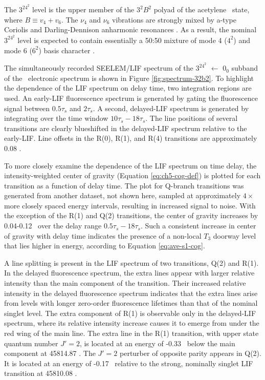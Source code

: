 The $3^24^2$ level is the upper member of the $3^2B^2$ polyad of the
acetylene \astate\ state, where $B \equiv v_4 + v_6$.  The $\nu_4$ and
$\nu_6$ vibrations are strongly mixed by a-type Coriolis and
Darling-Dennison anharmonic resonances \cite{merer08}.  As a result,
the nominal $3^24^2$ level is expected to contain essentially a 50:50
mixture of mode 4 ($4^2$) and mode 6 ($6^2$) basis character
\cite{merer08, virgo07}.

The simultaneously recorded SEELEM/LIF spectrum of the $3^24^2$ 
$\leftarrow$ $0_0$ subband of the \AtoX\ electronic spectrum is shown
in Figure \ref{fig:spectrum-32b2}. To highlight the dependence of the
LIF spectrum on delay time, two integration regions are used.  An
early-LIF fluorescence spectrum is generated by gating the
fluorescence signal between $0.5\tau_s$ and $2\tau_s$.  A second,
delayed-LIF spectrum is generated by integrating over the time window
$10\tau_s-18\tau_s$.  The line positions of several transitions are
clearly blueshifted in the delayed-LIF spectrum relative to the
early-LIF.  Line offsets in the R(0), R(1), and R(4) transitions are
approximately 0.08 \rcm.

To more closely examine the dependence of the LIF spectrum on time
delay, the intensity-weighted center of gravity (Equation
\ref{eq:ch5-cog-def}) is plotted for each transition as a function of
delay time.  The plot for Q-branch transitions was generated from
another dataset, not shown here, sampled at approximately $4 \times$
more closely spaced energy intervals, resulting in increased signal to
noise.  With the exception of the R(1) and Q(2) transitions, the
center of gravity increases by 0.04-0.12 \rcm\ over the delay range
$0.5\tau_s-18\tau_s$.  Such a consistent increase in center of gravity
with delay time indicates the presence of a non-local $T_3$ doorway
level that lies higher in energy, according to Equation
\ref{eq:ave-s1-cog}.


A line splitting is present in the LIF spectrum of two transitions,
Q(2) and R(1).  In the delayed fluorescence spectrum, the extra lines
appear with larger relative intensity than the main component of the
transition.  Their increased relative intensity in the delayed
fluorescence spectrum indicates that the extra lines arise from levels
with longer zero-order fluorescence lifetimes than that of the nominal
singlet level.  The extra component of R(1) is observable only in the
delayed-LIF spectrum, where its relative intensity increase causes it
to emerge from under the red wing of the main line.  The extra line in
the R(1) transition, with upper state quantum number $J'=2$, is
located at an energy of -0.33 \rcm\ below the main component at
45814.87 \rcm.  The $J'=2$ perturber of opposite parity appears in
Q(2).  It is located at an energy of -0.17 \rcm\ relative to the
strong, nominally singlet LIF transition at 45810.08 \rcm.

